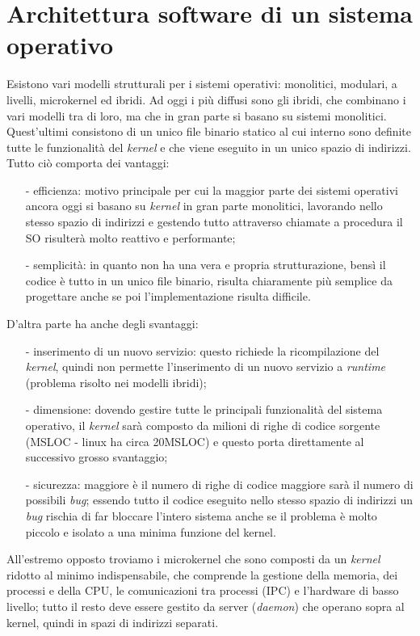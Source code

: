 \section{Architettura software di un sistema operativo}
Esistono vari modelli strutturali per i sistemi operativi: monolitici, modulari, a livelli, microkernel ed ibridi. Ad oggi i più diffusi sono gli ibridi, che combinano i vari modelli tra di loro, ma che in gran parte si basano su sistemi monolitici. Quest'ultimi consistono di un unico file binario statico al cui interno sono definite tutte le funzionalità del \textit{kernel} e che viene eseguito in un unico spazio di indirizzi. Tutto ciò comporta dei vantaggi: 
\begin{itemize}
	\item[-] efficienza: motivo principale per cui la maggior parte dei sistemi operativi ancora oggi si basano su \textit{kernel} in gran parte monolitici, lavorando nello stesso spazio di indirizzi e gestendo tutto attraverso chiamate a procedura il SO risulterà molto reattivo e performante;
	\item[-] semplicità: in quanto non ha una vera e  propria strutturazione, bensì il codice è tutto in un unico file binario, risulta chiaramente più semplice da progettare anche se poi l'implementazione risulta difficile.
\end{itemize} 
D'altra parte ha anche degli svantaggi: 
\begin{itemize}
	\item[-] inserimento di un nuovo servizio: questo richiede la ricompilazione del \textit{kernel}, quindi non permette l'inserimento di un nuovo servizio a \textit{runtime} (problema risolto nei modelli ibridi);
	\item[-] dimensione: dovendo gestire tutte le principali funzionalità del sistema operativo, il \textit{kernel} sarà composto da milioni di righe di codice sorgente (MSLOC - linux ha circa 20MSLOC) e questo porta direttamente al successivo grosso svantaggio;
	\item[-] sicurezza: maggiore è il numero di righe di codice maggiore sarà il numero di possibili \textit{bug}; essendo tutto il codice eseguito nello stesso spazio di indirizzi un \textit{bug} rischia di far bloccare l'intero sistema anche se il problema è molto piccolo e isolato a una minima funzione del kernel.
\end{itemize}

All'estremo opposto troviamo i microkernel che sono composti da un \textit{kernel} ridotto al minimo indispensabile, che comprende la gestione della memoria, dei processi e della CPU, le comunicazioni tra processi (IPC) e l'hardware di basso livello; tutto il resto deve essere gestito da server (\textit{daemon}) che operano sopra al kernel, quindi in spazi di indirizzi separati.

